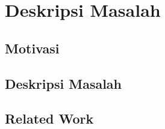 \section{Deskripsi Masalah}

	\subsection{Motivasi}
	\lipsum[1]

	\subsection{Deskripsi Masalah}
	\lipsum[1]

	\subsection{Related Work}
	\lipsum[1]